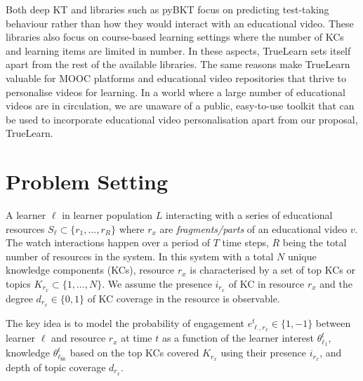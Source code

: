 \documentclass[letterpaper]{article} %
\begin{document}
Both deep KT and libraries such as pyBKT focus on predicting test-taking behaviour \cite{psych5030050} rather than how they would interact with an educational video. These libraries also focus on course-based learning settings where the number of KCs and learning items are limited in number. In these aspects, TrueLearn sets itself apart from the rest of the available libraries. The same reasons make TrueLearn valuable for MOOC platforms and educational video repositories that thrive to personalise videos for learning. In a world where a large number of educational videos are in circulation, we are unaware of a public, easy-to-use toolkit that can be used to incorporate educational video personalisation apart from our proposal, TrueLearn. 



\section{Problem Setting}

A learner $\ell$ in learner population $L$ interacting with a series of educational resources $S_\ell \subset \{r_1, \ldots, r_{R}\}$ where $r_x$ are \emph{fragments/parts} of an educational video $v$. The watch interactions happen over a period of $T$ time steps, $R$ being the total number of resources in the system.
In this system with a total $N$ unique knowledge components (KCs), resource $r_x$ is characterised by a set of top KCs or topics $K_{r_x} \subset \{1, \ldots, N \}$. We assume the presence $i_{r_x}$ of KC in resource $r_x$ and the degree $d_{r_x}\in \{ 0,1\}$ of KC coverage in the resource is observable.

The key idea is to model the probability of engagement $e_{\ell, r_x}^{t} \in \{ 1, -1\}$ between learner $\ell$ and resource $r_x$ at time $t$ as a function of the learner interest $\theta^t_{\ell_{\texttt{I}}}$, knowledge $\theta^t_{\ell_{\texttt{NK}}}$ based on the top KCs covered $K_{r_x}$ using their presence $i_{r_x}$, and depth of topic coverage $d_{r_x}$.
\end{document}
